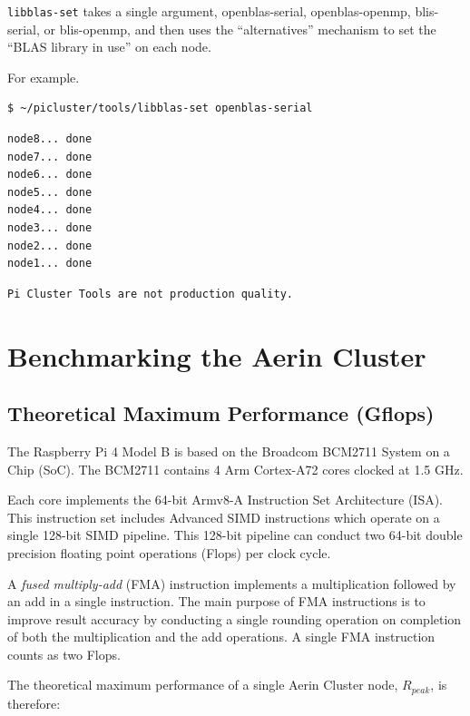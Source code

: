 \documentclass{report}
\begin{document}
\verb|libblas-set| takes a single argument, openblas-serial, openblas-openmp, blis-serial, or blis-openmp, and then uses the ``alternatives'' mechanism to set the ``BLAS library in use'' on each node.

For example.

\lstset{style=type}
\begin{lstlisting}
$ ~/picluster/tools/libblas-set openblas-serial
\end{lstlisting}

\lstset{style=term}
\begin{lstlisting}
node8... done
node7... done 
node6... done 
node5... done 
node4... done 
node3... done 
node2... done 
node1... done 
\end{lstlisting}

\lstset{style=hack}
\begin{lstlisting}
Pi Cluster Tools are not production quality.
\end{lstlisting}



%
%
\chapter{Benchmarking the Aerin Cluster}

%
%
\section{Theoretical Maximum Performance (Gflops)}

The Raspberry Pi 4 Model B is based on the Broadcom BCM2711 System on a Chip (SoC). The BCM2711 contains 4 Arm Cortex-A72 cores clocked at 1.5 GHz.

Each core implements the 64-bit Armv8-A Instruction Set Architecture (ISA). This instruction set includes Advanced SIMD instructions which operate on a single 128-bit SIMD pipeline. This 128-bit pipeline can conduct two 64-bit double precision floating point operations (Flops) per clock cycle.  

A \emph{fused multiply-add} (FMA) instruction implements a multiplication followed by an add in a single instruction. The main purpose of FMA instructions is to improve result accuracy by conducting a single rounding operation on completion of both the multiplication and the add operations. A single FMA instruction counts as two Flops. 

The theoretical maximum performance of a single Aerin Cluster node, $R_{peak}$, is therefore:
\end{document}
